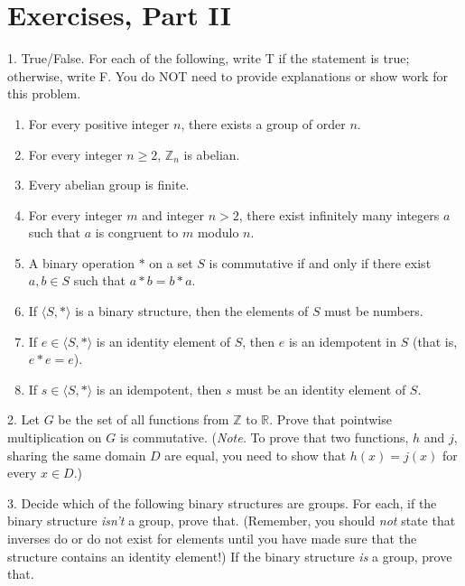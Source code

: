 \documentclass[10pt,openany,oneside]{book}
\theoremstyle{plain}
\theoremstyle{definition}
\theoremstyle{definition}
\theoremstyle{definition}
\theoremstyle{definition}
\numberwithin{equation}{section}
\def\Z{\mathbb{Z}}
\def\R{\mathbb{R}}
\begin{document}
\section[{Exercises, Part II}]{Exercises, Part II}\label{exercises-3}
\begin{exerciselist}
\item[1.]\hypertarget{exercise-12}{}True/False. For each of the following, write T if the statement is true; otherwise, write F. You do NOT need to provide explanations or show work for this problem. \leavevmode%
\begin{enumerate}[label=(\alph*)]
\item\hypertarget{li-99}{}For every positive integer \(n\), there exists a group of order \(n\).%
\item\hypertarget{li-100}{}For every integer \(n\geq 2\), \(\Z_n\) is abelian.%
\item\hypertarget{li-101}{}Every abelian group is finite.%
\item\hypertarget{li-102}{}For every integer \(m\) and integer \(n>2\), there exist infinitely many integers \(a\) such that \(a\) is congruent to \(m\) modulo \(n\).%
\item\hypertarget{li-103}{}A binary operation \(*\) on a set \(S\) is commutative if and only if there exist \(a,b\in S\) such that \(a*b=b*a\).%
\item\hypertarget{li-104}{}If \(\langle S, *\rangle\) is a binary structure, then the elements of \(S\) must be numbers.%
\item\hypertarget{li-105}{}If \(e\in \langle S,*\rangle\) is an identity element of \(S\), then \(e\) is an idempotent in \(S\) (that is, \(e*e=e\)).%
\item\hypertarget{li-106}{}If \(s\in \langle S,*\rangle\) is an idempotent, then \(s\) must be an identity element of \(S\).%
\end{enumerate}
%
\par\smallskip
\item[2.]\hypertarget{exercise-13}{}Let \(G\) be the set of all functions from \(\Z\) to \(\R\). Prove that pointwise multiplication on \(G\) is commutative. (\emph{Note.} To prove that two functions, \(h\) and \(j\), sharing the same domain \(D\) are equal, you need to show that \(h(x)=j(x)\) for every \(x\in D\).)%
\par\smallskip
\item[3.]\hypertarget{exercise-14}{}Decide which of the following binary structures are groups. For each, if the binary structure \emph{isn't} a group, prove that. (Remember, you should \emph{not} state that inverses do or do not exist for elements until you have made sure that the structure contains an identity element!) If the binary structure \emph{is} a group, prove that. \leavevmode%

\end{exerciselist}
\end{document}
